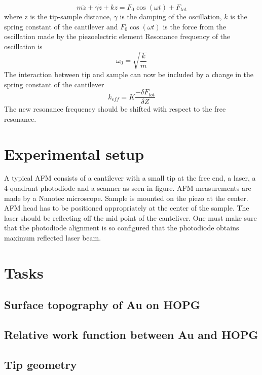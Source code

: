 \documentclass{article}
\begin{document}
 \begin{equation}
     m\ddot{z} + \gamma \dot{z} + kz = F_{0}\cos(\omega t) + F_{tot}
 \end{equation}
where z is the tip-sample distance, $\gamma$ is the damping of the oscillation, $k$ is the spring constant of the cantilever and $F_{0}\cos(\omega t)$ is the force from the oscillation made by the piezoelectric element
Resonance frequency of the oscillation is \begin{equation}
    \omega_{0} = \sqrt{\frac{k}{m}}
\end{equation}
The interaction between tip and sample can now be included by a change in the spring constant of the cantilever 
\begin{equation}
    k_{eff} = K \frac{-\delta F_{tot}}{\delta Z} 
\end{equation}
The new resonance frequency should be shifted with respect to the free resonance. 

\section{Experimental setup}
A typical AFM consists of a cantilever with a small tip at the free end, a laser, a 4-quadrant photodiode and a scanner as seen in figure. AFM measurements are made by a Nanotec microscope. Sample is mounted on the piezo at the center. AFM head has to be positioned appropriately at the center of the sample. The laser should be reflecting off the mid point of the canteliver. One must make sure that the photodiode alignment is so configured that the photodiode obtains maximum reflected laser beam.
\section{Tasks}

\subsection{Surface topography of Au on HOPG}

\subsection{Relative work function between Au and HOPG}

\subsection{Tip geometry}
\end{document}
